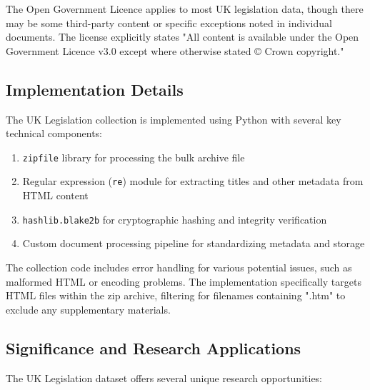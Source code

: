 The Open Government Licence applies to most UK legislation data, though there may be some third-party content or specific exceptions noted in individual documents. The license explicitly states "All content is available under the Open Government Licence v3.0 except where otherwise stated © Crown copyright."

\subsection{Implementation Details}

The UK Legislation collection is implemented using Python with several key technical components:

\begin{enumerate}
    \item \texttt{zipfile} library for processing the bulk archive file
    
    \item Regular expression (\texttt{re}) module for extracting titles and other metadata from HTML content
    
    \item \texttt{hashlib.blake2b} for cryptographic hashing and integrity verification
    
    \item Custom document processing pipeline for standardizing metadata and storage
\end{enumerate}

The collection code includes error handling for various potential issues, such as malformed HTML or encoding problems. The implementation specifically targets HTML files within the zip archive, filtering for filenames containing ".htm" to exclude any supplementary materials.

\subsection{Significance and Research Applications}

The UK Legislation dataset offers several unique research opportunities:

